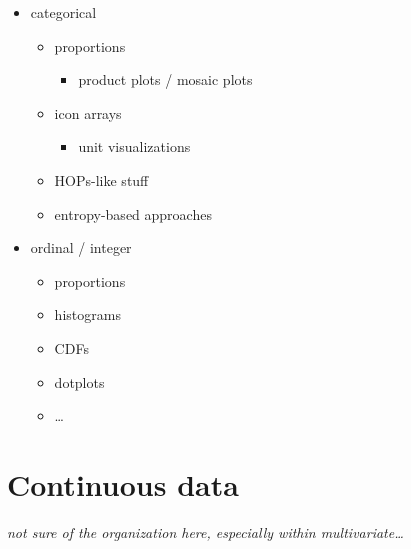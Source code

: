 \documentclass[]{book}
\providecommand{\tightlist}{%
  \setlength{\itemsep}{0pt}\setlength{\parskip}{0pt}}
\theoremstyle{definition}
\theoremstyle{definition}
\theoremstyle{definition}
\theoremstyle{remark}
\begin{document}
\begin{itemize}
\tightlist
\item
  categorical

  \begin{itemize}
  \tightlist
  \item
    proportions

    \begin{itemize}
    \tightlist
    \item
      product plots / mosaic plots
    \end{itemize}
  \item
    icon arrays

    \begin{itemize}
    \tightlist
    \item
      unit visualizations
    \end{itemize}
  \item
    HOPs-like stuff
  \item
    entropy-based approaches
  \end{itemize}
\item
  ordinal / integer

  \begin{itemize}
  \tightlist
  \item
    proportions
  \item
    histograms
  \item
    CDFs
  \item
    dotplots
  \item
    \ldots{}
  \end{itemize}
\end{itemize}

\hypertarget{ch-continuous}{%
\chapter{Continuous data}\label{ch-continuous}}

\emph{not sure of the organization here, especially within
multivariate\ldots{}}
\end{document}
